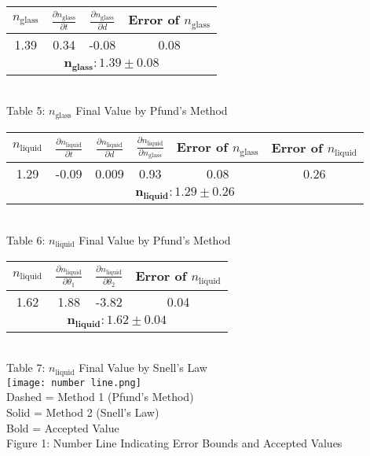 \begin{center}
    \centering
    \begin{tabular}{|c|c|c|c|}
    \hline
        $n_\text{glass}$ & $\frac{\partial n_\text{glass}}{\partial t}$ & $\frac{\partial n_\text{glass}}{\partial d}$ & Error of $n_\text{glass}$ \\ \hline
        1.39 & 0.34 & -0.08 & 0.08 \\ \hline
        \multicolumn{4}{|c|}{$\bm{n_\textbf{glass}: 1.39\pm0.08}$}\\\hline
    \end{tabular}
    \vspace{3mm}
    \\ Table 5: $n_\text{glass}$ Final Value by Pfund's Method\\
    \vspace{5mm}
    \centering
    \begin{tabular}{|c|c|c|c|c|c|}
    \hline
        $n_\text{liquid}$ & $\frac{\partial n_\text{liquid}}{\partial t}$ & $\frac{\partial n_\text{liquid}}{\partial d}$ & $\frac{\partial n_\text{liquid}}{\partial n_{\text{glass}}}$ & Error of $n_\text{glass}$ & Error of $n_\text{liquid}$ \\ \hline
        1.29 & -0.09 & 0.009 & 0.93 & 0.08 & 0.26 \\ \hline
        \multicolumn{6}{|c|}{$\bm{n_\textbf{liquid}: 1.29\pm0.26}$}\\\hline
    \end{tabular} 
    \vspace{3mm}
    \\ Table 6: $n_\text{liquid}$ Final Value by Pfund's Method\\
    \vspace{5mm} 
    \centering
    \begin{tabular}{|c|c|c|c|}
    \hline
        $n_\text{liquid}$ & $\frac{\partial n_\text{liquid}}{\partial \theta_1}$ & $\frac{\partial n_\text{liquid}}{\partial \theta_2}$  & Error of $n_\text{liquid}$ \\ \hline
        1.62 & 1.88 & -3.82 & 0.04  \\ \hline
        \multicolumn{4}{|c|}{$\bm{n_\textbf{liquid}: 1.62\pm0.04}$}\\\hline
    \end{tabular} 
    \vspace{3mm}
    \\ Table 7: $n_\text{liquid}$ Final Value by Snell's Law\\
    \vspace{5mm}
    \texttt{[image: number line.png]}\\
    Dashed = Method 1 (Pfund's Method)\\
    Solid = Method 2 (Snell's Law)\\
    Bold = Accepted Value \\
    Figure 1: Number Line Indicating Error Bounds and Accepted Values   
\end{center}
